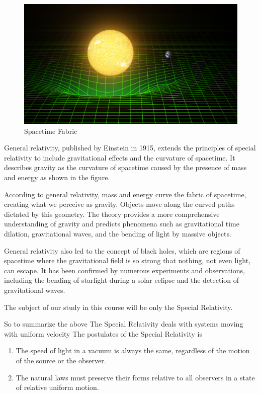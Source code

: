 \begin{figure}
    \centering
    \includegraphics[width=1\linewidth,keepaspectratio]{spacetimefabric}
    \captionlabelfalse
    \caption{Spacetime Fabric}
    \label{fig:spacetimefabric} 
\end{figure}
General relativity, published by Einstein in 1915, extends the principles of special relativity to include gravitational effects and the curvature of spacetime. It describes gravity as the curvature of spacetime caused by the presence of mass and energy as shown in the figure.\par
According to general relativity, mass and energy curve the fabric of spacetime, creating what we perceive as gravity. Objects move along the curved paths dictated by this geometry. The theory provides a more comprehensive understanding of gravity and predicts phenomena such as gravitational time dilation, gravitational waves, and the bending of light by massive objects.\par
General relativity also led to the concept of black holes, which are regions of spacetime where the gravitational field is so strong that nothing, not even light, can escape. It has been confirmed by numerous experiments and observations, including the bending of starlight during a solar eclipse and the detection of gravitational waves.\par

\vspace*{2cm}
The subject of our study in this course will be only the Special Relativity. 

So to summarize the above
The Special Relativity deals with systems moving with uniform velocity
The postulates of the Special Relativity is
\begin{enumerate}
\item The speed of light in a vacuum is always the same, regardless of the motion of the source or the observer. 
\item The natural laws must preserve their forms relative to all observers in a state of relative uniform motion.
\end{enumerate}

